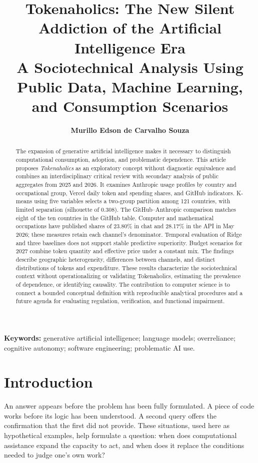 \documentclass[11pt,a4paper]{article}
\author[1]{\textbf{Murillo Edson de Carvalho Souza}}
\affil[1]{University of Brasília (UnB)\\Department of Computer Science}
\date{}
\begin{document}
\title{\textbf{Tokenaholics: The New Silent Addiction of the Artificial Intelligence Era}\\[0.5em]\large A Sociotechnical Analysis Using Public Data, Machine Learning, and Consumption Scenarios}
\maketitle
\begin{abstract}
The expansion of generative artificial intelligence makes it necessary to distinguish computational consumption, adoption, and problematic dependence. This article proposes \textit{Tokenaholics} as an exploratory concept without diagnostic equivalence and combines an interdisciplinary critical review with secondary analysis of public aggregates from 2025 and 2026. It examines Anthropic usage profiles by country and occupational group, Vercel daily token and spending shares, and GitHub indicators. K-means using five variables selects a two-group partition among 121 countries, with limited separation (silhouette of 0.308). The GitHub--Anthropic comparison matches eight of the ten countries in the GitHub table. Computer and mathematical occupations have published shares of 23.80\% in chat and 28.17\% in the API in May 2026; these measures retain each channel's denominator. Temporal evaluation of Ridge and three baselines does not support stable predictive superiority. Budget scenarios for 2027 combine token quantity and effective price under a constant mix. The findings describe geographic heterogeneity, differences between channels, and distinct distributions of tokens and expenditure. These results characterize the sociotechnical context without operationalizing or validating Tokenaholics, estimating the prevalence of dependence, or identifying causality. The contribution to computer science is to connect a bounded conceptual definition with reproducible analytical procedures and a future agenda for evaluating regulation, verification, and functional impairment.
\end{abstract}
\noindent\textbf{Keywords:} generative artificial intelligence; language models; overreliance; cognitive autonomy; software engineering; problematic AI use.

\section{Introduction}
An answer appears before the problem has been fully formulated. A piece of code works before its logic has been understood. A second query offers the confirmation that the first did not provide. These situations, used here as hypothetical examples, help formulate a question: when does computational assistance expand the capacity to act, and when does it replace the conditions needed to judge one's own work?
\end{document}
